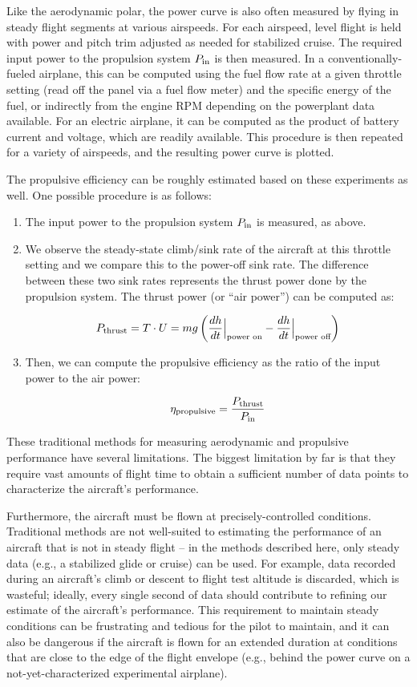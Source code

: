 Like the aerodynamic polar, the power curve is also often measured by flying in steady flight segments at various airspeeds. For each airspeed, level flight is held with power and pitch trim adjusted as needed for stabilized cruise. The required input power to the propulsion system $P_{\rm in}$ is then measured. In a conventionally-fueled airplane, this can be computed using the fuel flow rate at a given throttle setting (read off the panel via a fuel flow meter) and the specific energy of the fuel, or indirectly from the engine RPM depending on the powerplant data available. For an electric airplane, it can be computed as the product of battery current and voltage, which are readily available. This procedure is then repeated for a variety of airspeeds, and the resulting power curve is plotted.

The propulsive efficiency can be roughly estimated based on these experiments as well. One possible procedure is as follows:

\begin{enumerate}
    \item The input power to the propulsion system $P_{\rm in}$ is measured, as above.
    \item We observe the steady-state climb/sink rate of the aircraft at this throttle setting and we compare this to the power-off sink rate. The difference between these two sink rates represents the thrust power done by the propulsion system. The thrust power (or ``air power'') can be computed as:

    $$P_{\rm thrust}=T \cdot U = m g \left( \frac{dh}{dt}\Big |_\text{power on} - \frac{dh}{dt}\Big |_\text{power off} \right)$$

    \item Then, we can compute the propulsive efficiency as the ratio of the input power to the air power:

    $$\eta_{\rm propulsive} = \frac{P_{\rm thrust}}{P_{\rm in}}$$

\end{enumerate}

These traditional methods for measuring aerodynamic and propulsive performance have several limitations. The biggest limitation by far is that they require vast amounts of flight time to obtain a sufficient number of data points to characterize the aircraft's performance.

Furthermore, the aircraft must be flown at precisely-controlled conditions. Traditional methods are not well-suited to estimating the performance of an aircraft that is not in steady flight -- in the methods described here, only steady data (e.g., a stabilized glide or cruise) can be used. For example, data recorded during an aircraft's climb or descent to flight test altitude is discarded, which is wasteful; ideally, every single second of data should contribute to refining our estimate of the aircraft's performance. This requirement to maintain steady conditions can be frustrating and tedious for the pilot to maintain, and it can also be dangerous if the aircraft is flown for an extended duration at conditions that are close to the edge of the flight envelope (e.g., behind the power curve on a not-yet-characterized experimental airplane).

